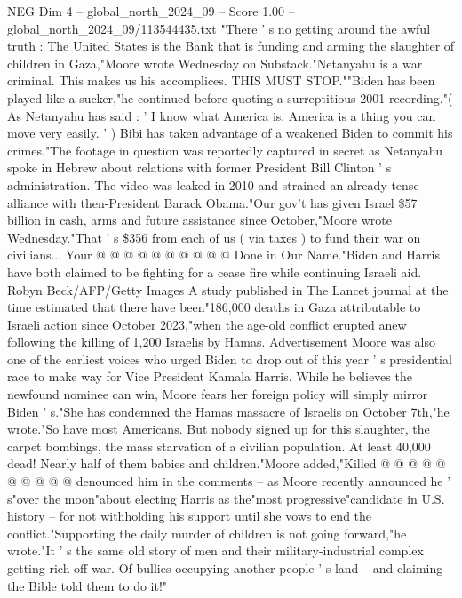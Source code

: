 \begin{textsample}{NEG Dim 4 – global\_north\_2024\_09 – Score 1.00 – global\_north\_2024\_09/113544435.txt}  \label{ex:f4_neg_149}
"There ' s no getting around the awful truth : The United States is the Bank that is funding and arming the slaughter of children in Gaza,"Moore wrote Wednesday on Substack."Netanyahu is a war criminal.
This makes us his accomplices.
THIS MUST STOP.""Biden has been played like a sucker,"he continued before quoting a surreptitious 2001 recording."( As Netanyahu has said : ' I know what America is.
America is a thing you can move very easily. ' ) Bibi has taken advantage of a weakened Biden to commit his crimes."The footage in question was reportedly captured in secret as Netanyahu spoke in Hebrew about relations with former President Bill Clinton ' s administration.
The video was leaked in 2010 and strained an already-tense alliance with then-President Barack Obama."Our gov't has given Israel \$57 billion in cash, arms and future assistance since October,"Moore wrote Wednesday."That ' s \$356 from each of us ( via taxes ) to fund their war on civilians...
Your @ @ @ @ @ @ @ @ @ @ Done in Our Name."Biden and Harris have both claimed to be fighting for a cease fire while continuing Israeli aid.
Robyn Beck/AFP/Getty Images A study published in The Lancet journal at the time estimated that there have been"186,000 deaths in Gaza attributable to Israeli action since October 2023,"when the age-old conflict erupted anew following the killing of 1,200 Israelis by Hamas.
Advertisement Moore was also one of the earliest voices who urged Biden to drop out of this year ' s presidential race to make way for Vice President Kamala Harris.
While he believes the newfound nominee can win, Moore fears her foreign policy will simply mirror Biden ' s."She has condemned the Hamas massacre of Israelis on October 7th,"he wrote."So have most Americans.
But nobody signed up for this slaughter, the carpet bombings, the mass starvation of a civilian population.
At least 40,000 dead!
Nearly half of them babies and children."Moore added,"Killed @ @ @ @ @ @ @ @ @ @ denounced him in the comments -- as Moore recently announced he ' s"over the moon"about electing Harris as the"most progressive"candidate in U.S. history -- for not withholding his support until she vows to end the conflict."Supporting the daily murder of children is not going forward,"he wrote."It ' s the same old story of men and their military-industrial complex getting rich off war.
Of bullies occupying another people ' s land -- and claiming the Bible told them to do it!"

\end{textsample}

